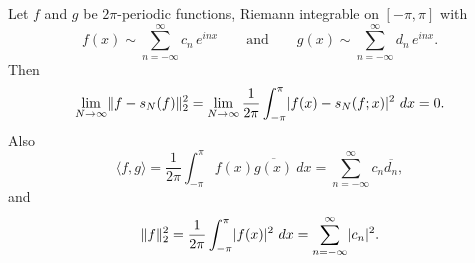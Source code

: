 \begin{samepage}
\begin{thm} 
Let $f$ and $g$ be $2\pi$-periodic functions, Riemann integrable 
on $[-\pi,\pi]$
with
\begin{equation*}
f(x) \sim
\sum_{n=-\infty}^\infty c_n \,e^{inx}
\qquad \text{and} \qquad
g(x) \sim
\sum_{n=-\infty}^\infty d_n \,e^{inx} .
\end{equation*}
Then
\begin{equation*}
\lim_{N\to\infty} \lVert {f-s_N(f)} \rVert_2^2 = 
\lim_{N\to\infty}
\frac{1}{2\pi}
\int_{-\pi}^\pi
\lvert {f(x)-s_N(f;x)} \rvert^2 ~ dx
=0 .
\end{equation*}
Also
\begin{equation*}
\langle f , g \rangle =
\frac{1}{2\pi}
\int_{-\pi}^\pi
f(x) \overline{g(x)}~ dx
=
\sum_{n=-\infty}^\infty c_n \overline{d_n} ,
\end{equation*}
and
\begin{equation*}
\lVert {f} \rVert_2^2
=
\frac{1}{2\pi}
\int_{-\pi}^\pi
\lvert {f(x)} \rvert^2 ~ dx
=
\sum_{n=-\infty}^\infty \lvert {c_n} \rvert^2.
\end{equation*}
\end{thm}
\end{samepage}

